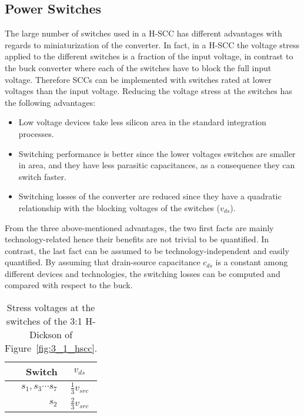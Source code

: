 \subsection{Power Switches}
The large number of switches used in a H-SCC has different advantages with regards to miniaturization of the converter. In fact, in a H-SCC the voltage stress applied to the different switches is a fraction of the input voltage, in contrast to the buck converter where each of the switches have to block the full input voltage. Therefore SCCs can be implemented with switches rated at lower voltages than the input voltage. Reducing the voltage stress at the switches has the following advantages:
\begin{itemize}
  \item Low voltage devices take less silicon area in the standard integration processes.
  \item Switching performance is better since the lower voltages switches are smaller in area, and they have less parasitic capacitances, as a consequence they can switch faster.
  \item Switching losses of the converter are reduced since they have a quadratic relationship with the blocking voltages of the switches ($v_{ds}$).
\end{itemize}
From the three above-mentioned advantages, the two first facts are mainly technology-related hence their benefits are not trivial to be quantified. In contrast, the last fact can be assumed to be technology-independent and easily quantified. By assuming that drain-source capacitance $c_{ds}$ is a constant among different devices and technologies, the switching losses can be computed and compared with respect to the buck.
\begin{table}[h]
\centering
\caption{Stress voltages at the switches of the 3:1 H-Dickson of Figure~\ref{fig:3_1_hscc}.}
\label{tab:3:1 H-Dick_V_stress}
\renewcommand{\arraystretch}{1.5}%
\begin{tabular}{r  c}
 Switch & $v_{ds}$  \\
 \midrule
 $s_1,s_3 \cdots s_7$ & $\frac{1}{3} v_{src}$ \\
 $s_2$ & $\frac{2 }{3} v_{src}$
\end{tabular}
\end{table}


